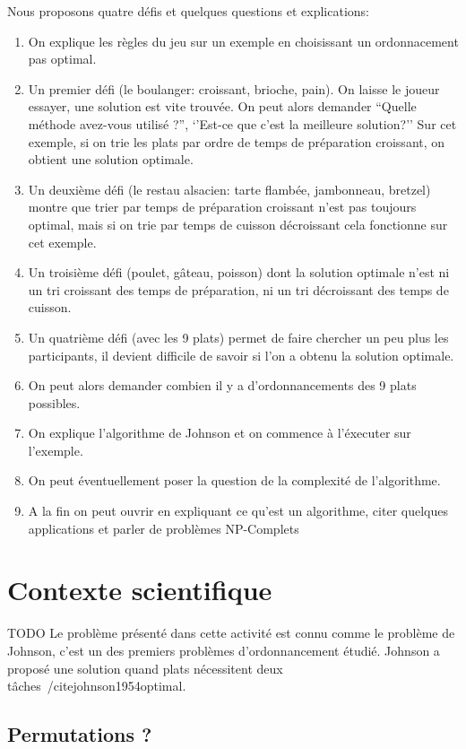 \documentclass[a4paper]{article}
\begin{document}
Nous proposons quatre défis et quelques questions et explications:
\begin{enumerate}
\item On explique les règles du jeu sur un exemple en choisissant un ordonnacement pas optimal.
\item Un premier défi (le boulanger: croissant, brioche, pain). On laisse le joueur essayer, une solution est vite trouvée. On peut alors demander ``Quelle méthode avez-vous utilisé ?'', `'Est-ce que c'est la meilleure solution?''
Sur cet exemple, si on trie les plats par ordre de temps de préparation croissant, on obtient une solution optimale. 
\item Un deuxième défi (le restau alsacien: tarte flambée, jambonneau, bretzel) montre que trier par temps de préparation croissant n'est pas toujours optimal, mais si on trie par temps de cuisson décroissant cela fonctionne sur cet exemple.
\item Un troisième défi (poulet, gâteau, poisson) dont la solution optimale n'est ni un tri croissant des temps de préparation, ni un tri décroissant des temps de cuisson.
\item Un quatrième défi (avec les 9 plats) permet de faire chercher un peu plus les participants, il devient difficile de savoir si l'on a obtenu la solution optimale.
\item On peut alors demander combien il y a d'ordonnancements des 9 plats possibles.
\item On explique l'algorithme de Johnson et on commence à l'éxecuter sur l'exemple.
\item On peut éventuellement poser la question de la complexité de l'algorithme.
\item A la fin on peut ouvrir en expliquant ce qu'est un algorithme, citer quelques applications et parler de problèmes NP-Complets 
\end{enumerate}

\section{Contexte scientifique}

TODO
Le problème présenté dans cette activité est connu comme le problème de Johnson, c'est un des premiers problèmes d'ordonnancement étudié. Johnson a proposé une solution quand plats nécessitent deux tâches~/cite{johnson1954optimal}.

\subsection{Permutations ?}
\end{document}
